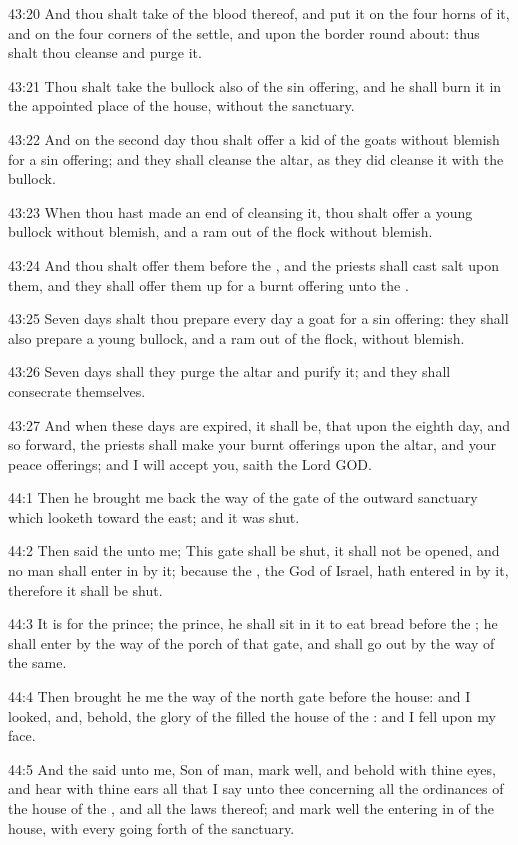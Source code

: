 43:20 And thou shalt take of the blood thereof, and put it on the four horns of it, and on the four corners of the settle, and upon the border round about: thus shalt thou cleanse and purge it.

43:21 Thou shalt take the bullock also of the sin offering, and he shall burn it in the appointed place of the house, without the sanctuary.

43:22 And on the second day thou shalt offer a kid of the goats without blemish for a sin offering; and they shall cleanse the altar, as they did cleanse it with the bullock.

43:23 When thou hast made an end of cleansing it, thou shalt offer a young bullock without blemish, and a ram out of the flock without blemish.

43:24 And thou shalt offer them before the \LORD, and the priests shall cast salt upon them, and they shall offer them up for a burnt offering unto the \LORD.

43:25 Seven days shalt thou prepare every day a goat for a sin offering: they shall also prepare a young bullock, and a ram out of the flock, without blemish.

43:26 Seven days shall they purge the altar and purify it; and they shall consecrate themselves.

43:27 And when these days are expired, it shall be, that upon the eighth day, and so forward, the priests shall make your burnt offerings upon the altar, and your peace offerings; and I will accept you, saith the Lord GOD.

44:1 Then he brought me back the way of the gate of the outward sanctuary which looketh toward the east; and it was shut.

44:2 Then said the \LORD unto me; This gate shall be shut, it shall not be opened, and no man shall enter in by it; because the \LORD, the God of Israel, hath entered in by it, therefore it shall be shut.

44:3 It is for the prince; the prince, he shall sit in it to eat bread before the \LORD; he shall enter by the way of the porch of that gate, and shall go out by the way of the same.

44:4 Then brought he me the way of the north gate before the house: and I looked, and, behold, the glory of the \LORD filled the house of the \LORD: and I fell upon my face.

44:5 And the \LORD said unto me, Son of man, mark well, and behold with thine eyes, and hear with thine ears all that I say unto thee concerning all the ordinances of the house of the \LORD, and all the laws thereof; and mark well the entering in of the house, with every going forth of the sanctuary.

